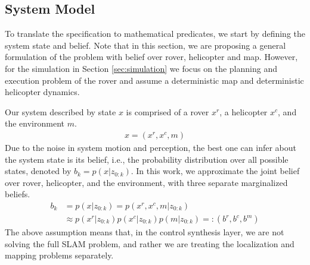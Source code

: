 \documentclass[letterpaper]{article} %
\begin{document}
	
	\subsection{System Model}\label{sec:SysModel}
    To translate the specification to mathematical predicates, we start by defining the system state and belief. Note that in this section, we are proposing a general formulation of the problem with belief over rover, helicopter and map. However, for the simulation in Section \ref{sec:simulation} we focus on the planning and execution problem of the rover and assume a deterministic map and deterministic helicopter dynamics.
    
    Our system described by state $x$ is comprised of a rover $x^r$, a helicopter $x^c$, and the environment $m$.
    \begin{align}
        x = (x^r, x^c, m) 
    \end{align}
    Due to the noise in system motion and perception, the best one can infer about the system state is its belief, i.e., the probability distribution over all possible states, denoted by $b_k=p(x|z_{0:k})$. In this work, we approximate the joint belief over rover, helicopter, and the environment, with three separate marginalized beliefs.
    \begin{align}
        \nonumber
        b_k &= p(x|z_{0:k})=p(x^r, x^c, m|z_{0:k})\\
        &\approx p(x^r|z_{0:k})p(x^c|z_{0:k})p(m|z_{0:k})=:(b^r, b^c, b^m)
    \end{align}
    The above assumption means that, in the control synthesis layer, we are not solving the full SLAM problem, and rather we are treating the localization and mapping problems separately. %
    
\end{document}
